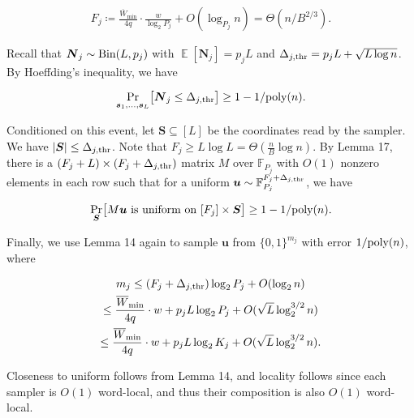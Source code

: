 \[\begin{gathered}
F_{j}\coloneq\frac{\overline{W}_{\min}}{4q}\cdot\frac{w}{\log_{2}P_{j}}+O(\log_{P_{j}}n)=\Theta(n/B^{2/3}).
\end{gathered}\]




Recall that $\boldsymbol{N}_{j}\sim\textnormal{Bin}(L,p_{j})$ with $\operatorname{\mathbb{E}}[\boldsymbol{N}_{j}]=p_{j}L$ and $\Delta_{j,{\rm thr}}=p_{j}L+\sqrt{L\log n}$.
By Hoeffding’s inequality, we have\par


\[\begin{gathered}
\Pr_{\boldsymbol{s}_{1},\ldots,\boldsymbol{s}_{L}}\bigl[\boldsymbol{N}_{j}\leq\Delta_{j,{\rm thr}}\bigr]\geq 1-1/\textnormal{poly}(n).
\end{gathered}\]


Conditioned on this event, let $\boldsymbol{S}\subseteq[L]$ be the coordinates read by the sampler.
We have $\lvert\boldsymbol{S}\rvert\leq\Delta_{j,{\rm thr}}$.
Note that $F_{j}\geq L\log L=\Theta(\tfrac{n}{B}\log n)$.
By Lemma 17, there is a $(F_{j}+L)\times(F_{j}+\Delta_{j,{\rm thr}})$ matrix $M$ over $\mathbb{F}_{P_{j}}$ with $O(1)$ nonzero elements in each row such that for a uniform $\boldsymbol{u}\sim\mathbb{F}_{P_{j}}^{F_{j}+\Delta_{j,{\rm thr}}}$, we have\par


\[\begin{gathered}
\Pr_{\boldsymbol{S}}\bigl[\text{$M\boldsymbol{u}$ is uniform on $[F_{j}]\times\boldsymbol{S}$}\bigr]\geq 1-1/\textnormal{poly}(n).
\end{gathered}\]


Finally, we use Lemma 14 again to sample $\boldsymbol{u}$ from $\{0,1\}^{m_{j}}$ with error $1/\textnormal{poly}(n)$, where\par


\[\begin{gathered}
\displaystyle m_{j} \displaystyle\leq(F_{j}+\Delta_{j,{\rm thr}})\log_{2}P_{j}+O(\log_{2}n) \\
\displaystyle\leq\frac{\overline{W}_{\min}}{4q}\cdot w+p_{j}L\log_{2}P_{j}+O(\sqrt{L}\log_{2}^{3/2}n) \\
\displaystyle\leq\frac{\overline{W}_{\min}}{4q}\cdot w+p_{j}L\log_{2}K_{j}+O(\sqrt{L}\log_{2}^{3/2}n).
\end{gathered}\]


Closeness to uniform follows from Lemma 14, and locality follows since each sampler is $O(1)$ word-local, and thus their composition is also $O(1)$ word-local.\par





